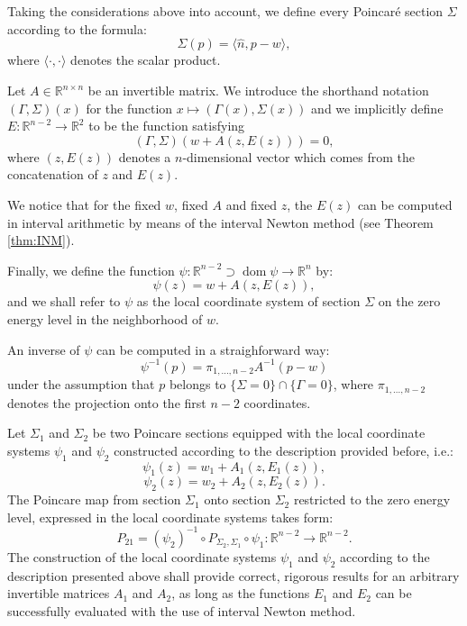 \documentclass[1p]{article}
\DeclareMathOperator{\dom}{dom}
\begin{document}
Taking the considerations above into account, we define every Poincar\'e section $\Sigma$ according to the formula:
\begin{equation}
    \label{eq:section-choice}
    \Sigma (p) = \langle \hat{n}, p-w \rangle,
\end{equation}
where $\langle\cdot,\cdot\rangle$ denotes the scalar product.

Let $A \in \mathbb{R}^{n \times n}$ be an invertible matrix. We introduce the shorthand notation $(\Gamma, \Sigma)(x)$ for the function $x \mapsto \left( \Gamma(x), \Sigma(x) \right)$ and we implicitly define $E : \mathbb{R}^{n-2} \to \mathbb{R}^2$ to be the function satisfying
\begin{equation}
    \label{eq:E-implicit-def}
    (\Gamma,\Sigma)(w + A(z,E(z)))=0,
\end{equation}
where $(z, E(z))$ denotes a $n$-dimensional vector which comes from the concatenation of $z$ and $E(z)$.

We notice that for the fixed $w$, fixed $A$ and fixed $z$, the $E(z)$ can be computed in interval arithmetic by means of the interval Newton method (see Theorem \ref{thm:INM}).

Finally, we define the function $\psi : \mathbb{R}^{n-2} \supset \dom\psi \to \mathbb{R}^{n}$ by:
\begin{equation}
    \label{eq:local-parametrization-choice}
    \psi(z) = w + A(z, E(z)),
\end{equation}
and we shall refer to $\psi$ as the local coordinate system of section $\Sigma$ on the zero energy level in the neighborhood of $w$.

An inverse of $\psi$ can be computed in a straighforward way:
\begin{equation}
    \label{eq:inverse-psi}
    \psi^{-1} (p) = \pi_{1, ..., n-2} A^{-1} (p - w)
\end{equation}
under the assumption that $p$ belongs to $\{\Sigma = 0 \} \cap \{ \Gamma = 0 \}$, where $\pi_{1, ..., n-2}$ denotes the projection onto the first $n-2$ coordinates.

Let $\Sigma_1$ and $\Sigma_2$ be two Poincare sections equipped with the local coordinate systems $\psi_1$ and $\psi_2$ constructed according to the description provided before, i.e.:
\[
    \psi_1 (z) = w_1 + A_1 (z, E_1 (z)),
\]
\[
    \psi_2 (z) = w_2 + A_2 (z, E_2 (z)).
\]
The Poincare map from section $\Sigma_1$ onto section $\Sigma_2$ restricted to the zero energy level, expressed in the local coordinate systems takes form:
\[
    P_{21} = (\psi_2)^{-1} \circ P_{\Sigma_2, \Sigma_1} \circ \psi_1 : \mathbb{R}^{n-2} \to \mathbb{R}^{n-2}.
\]
The construction of the local coordinate systems $\psi_1$ and $\psi_2$ according to the description presented above shall provide correct, rigorous results for an arbitrary invertible matrices $A_1$ and $A_2$, as long as the functions $E_1$ and $E_2$ can be successfully evaluated with the use of interval Newton method.
\end{document}

